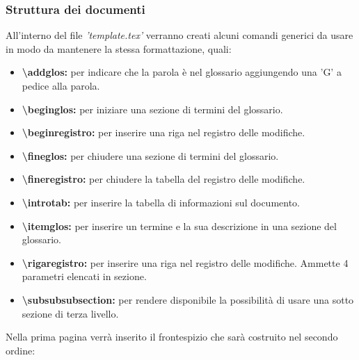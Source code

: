 \documentclass[a4paper,11pt]{article}
\begin{document}
			\subsubsection{Struttura dei documenti}
			All'interno del file \textit{'template.tex'} verranno creati alcuni comandi generici da usare in modo da mantenere la stessa formattazione, quali:
			\begin{itemize}
			\item \textbf{\textbackslash addglos:} per indicare che la parola è nel glossario aggiungendo una 'G' a pedice alla parola.
			\item \textbf{\textbackslash beginglos:} per iniziare una sezione di termini del glossario.			
			\item \textbf{\textbackslash beginregistro:} per inserire una riga nel registro delle modifiche.  
			\item \textbf{\textbackslash fineglos:} per chiudere una sezione di termini del glossario. 
			\item \textbf{\textbackslash fineregistro:} per chiudere la tabella del registro delle modifiche.
			\item \textbf{\textbackslash introtab:}  per inserire la tabella di informazioni sul documento.
			\item \textbf{\textbackslash itemglos:} per inserire un termine e la sua descrizione in una sezione del glossario.
			\item \textbf{\textbackslash rigaregistro:} per inserire una riga nel registro delle modifiche. Ammette 4 parametri elencati in sezione.
			\item \textbf{\textbackslash subsubsubsection:}  per rendere disponibile la possibilità di usare una sotto sezione di terza livello.
			\end{itemize}
				Nella prima pagina verrà inserito il frontespizio che sarà costruito nel secondo ordine: 
\end{document}
